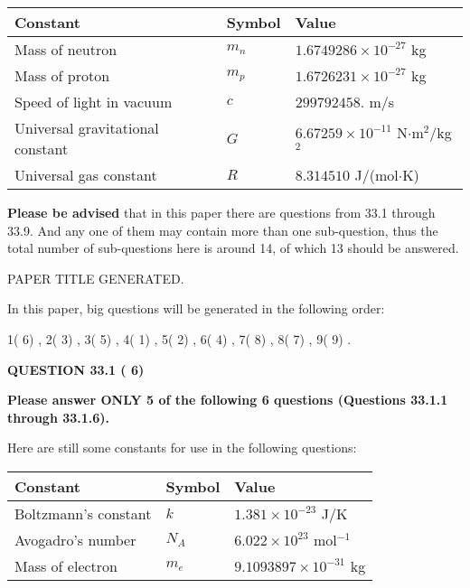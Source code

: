 \documentclass[12pt]{article}
\begin{document}
 
\noindent\begin{tabular}{|l|l|l|}
\hline
Constant & Symbol & Value \\
\hline
Mass of neutron &
$m_n$ &
 $ 1.6749286 \times 10^{-27} $
kg \\
\hline
Mass of proton &
$m_p$ &
 $ 1.6726231 \times 10^{-27} $
kg \\
\hline
Speed of light in vacuum &
$c$ &
 $ 299792458. $
m/s \\
\hline
Universal gravitational constant &
$G$ &
 $ 6.67259 \times 10^{-11} $
N$\cdot $m$^2$/kg$^2$ \\
\hline
Universal gas constant &
$R$ &
 $ 8.314510 $
J/(mol$\cdot $K) \\
\hline
\end{tabular}
 
 
{\textbf{\large{Please be advised}}} that in this paper there are questions from
33.1 through
33.9.
And any one of them may contain more than one sub-question, thus the total number
of sub-questions here is around 14, of which
13 should be answered.
 
\vspace{0.3in}
 
 
   
   
 PAPER TITLE GENERATED.
   
   
   
\vspace{0.2in}
   
In this paper, big questions will be generated in the following order: 
   
   
            1(          6)
 ,
            2(          3)
 ,
            3(          5)
 ,
            4(          1)
 ,
            5(          2)
 ,
            6(          4)
 ,
            7(          8)
 ,
            8(          7)
 ,
            9(          9)
 .
  
\vspace{0.2in}
  
{\textbf{\Large{QUESTION
33.1 
 (          6)
}}}
  
  
 
{\textbf{\Large{Please answer ONLY
5 of the following
6 questions (Questions
33.1.1 through
33.1.6). }}}
 
Here are still some constants for use in the following questions:
 
 
\noindent\begin{tabular}{|l|l|l|}
\hline
Constant & Symbol & Value \\
\hline
 
Boltzmann's constant &
$k$ &
 $ 1.381 \times 10^{-23} $
J/K \\
\hline
 
Avogadro's number &
$N_A$ &
 $ 6.022 \times 10^{23} $
mol$^{-1}$ \\
\hline
 
Mass of electron &
$m_e$ &
 $ 9.1093897 \times 10^{-31} $
kg \\
\hline
 
\end{tabular}
 
\end{document}
